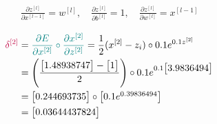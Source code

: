 \documentclass[12pt]{article}
\begin{document}
\begin{enumerate}[leftmargin=\labelsep]
        \begin{equation*}
          \begin{aligned}
            \frac{\partial z^{[l]}}{\partial x^{[l - 1]}} = w^{[l]}, \quad
            \frac{\partial z^{[l]}}{\partial b^{[l]}} = 1, \quad
            \frac{\partial z^{[l]}}{\partial w^{[l]}} = x^{[l - 1]}
          \end{aligned}
        \end{equation*}

        \pagebreak


        \begin{equation*}
          \begin{aligned}
            \textcolor{purple}{\delta^{[2]}} & = \textcolor{teal}{\frac{\partial E}{\partial x^{[2]}} \circ
              \frac{\partial x^{[2]}}{\partial z^{[2]}}}
            = \frac{1}{2}(x^{[2]} - z_i) \circ 0.1e^{0.1z^{[2]}}                                                     \\
                                             & = \left(
            \frac{\begin{bmatrix}
                      1.48938747
                    \end{bmatrix} - \begin{bmatrix}
                                      1
                                    \end{bmatrix}}{2}
            \right) \circ 0.1e^{0.1 \begin{bmatrix}
                                          3.9836494
                                        \end{bmatrix}}                                                                   \\
                                             & = \begin{bmatrix}
                                                   0.244693735
                                                 \end{bmatrix} \circ \begin{bmatrix} 0.1e^{0.39836494} \end{bmatrix} \\
                                             & = \begin{bmatrix}
                                                   0.03644437824
                                                 \end{bmatrix}
          \end{aligned}
        \end{equation*}


\end{enumerate}
\end{document}
